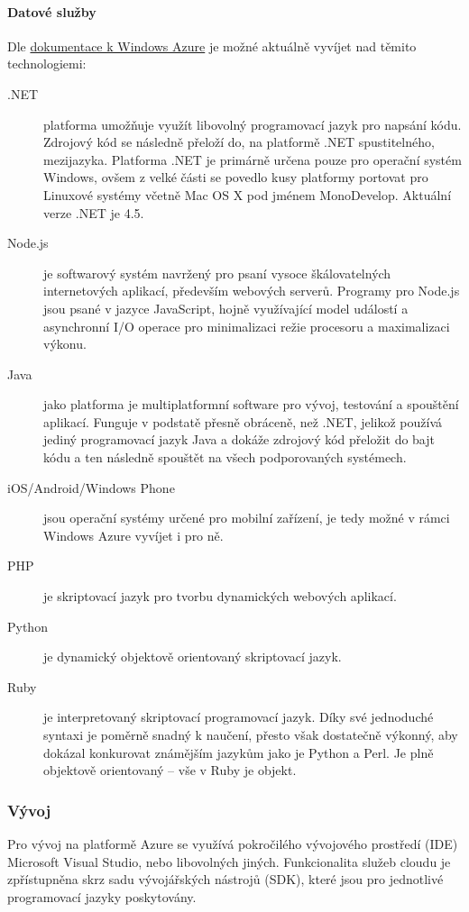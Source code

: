 \paragraph{Datové služby}
Dle \href{http://www.windowsazure.com/en-us/documentation/}{dokumentace k Windows Azure}\cite{azure:dokumentace} je možné aktuálně vyvíjet nad těmito technologiemi:
\begin{description}
	\item [.NET] platforma umožňuje využít libovolný programovací jazyk pro napsání kódu. Zdrojový kód se následně přeloží do, na platformě .NET spustitelného, mezijazyka. Platforma .NET je primárně určena pouze pro operační systém Windows, ovšem z velké části se povedlo kusy platformy portovat pro Linuxové systémy včetně Mac OS X pod jménem MonoDevelop. Aktuální verze .NET je 4.5.
	\item [Node.js] je softwarový systém navržený pro psaní vysoce škálovatelných internetových aplikací, především webových serverů. Programy pro Node.js jsou psané v jazyce JavaScript, hojně využívající model událostí a asynchronní I/O operace pro minimalizaci režie procesoru a maximalizaci výkonu.\cite{wiki:node.js}
	\item [Java] jako platforma je multiplatformní software pro vývoj, testování a spouštění aplikací. Funguje v podstatě přesně obráceně, než .NET, jelikož používá jediný programovací jazyk Java a dokáže zdrojový kód přeložit do bajt kódu a ten následně spouštět na všech podporovaných systémech.
	\item [iOS/Android/Windows Phone] jsou operační systémy určené pro mobilní zařízení, je tedy možné v rámci Windows Azure vyvíjet i pro ně.
	\item [PHP] je skriptovací jazyk pro tvorbu dynamických webových aplikací.
	\item [Python] je dynamický objektově orientovaný skriptovací jazyk.
	\item [Ruby] je interpretovaný skriptovací programovací jazyk. Díky své jednoduché syntaxi je poměrně snadný k naučení, přesto však dostatečně výkonný, aby dokázal konkurovat známějším jazykům jako je Python a Perl. Je plně objektově orientovaný – vše v Ruby je objekt.\cite{wiki:ruby}
\end{description}

\subsubsection{Vývoj}
Pro vývoj na platformě Azure se využívá pokročilého vývojového prostředí (IDE) Microsoft Visual Studio, nebo libovolných jiných. Funkcionalita služeb cloudu je zpřístupněna skrz sadu vývojářských nástrojů (SDK), které jsou pro jednotlivé programovací jazyky poskytovány. 

